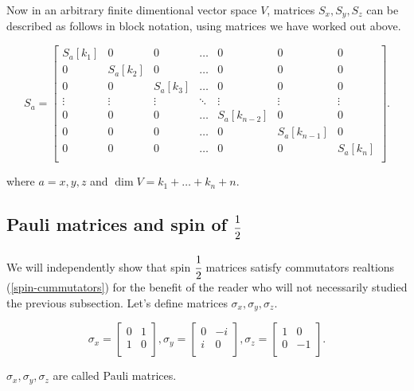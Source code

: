 \documentclass[main.tex]{subfiles}
\begin{document}
Now in an arbitrary finite dimentional vector space $V$, matrices $S_x, S_y, S_z$ can be described as follows in block notation, using matrices we have worked out above.

\begin{equation}
S_a = \begin{bmatrix}
    S_a[k_1] & 0 & 0 & \dots  & 0 & 0 & 0 \\
    0 & S_a[k_2] & 0 & \dots & 0 & 0 & 0\\
    0 & 0 & S_a[k_3] & \dots  & 0 & 0 & 0\\
    \vdots  & \vdots & \vdots  & \ddots & \vdots & \vdots & \vdots\\
    0 & 0 & 0 & \dots  & S_a[k_{n-2}] & 0 & 0 \\
    0 & 0 & 0 & \dots & 0 & S_a[k_{n-1}] & 0\\
    0 & 0 & 0 & \dots  & 0 & 0 & S_a[k_n]\\
\end{bmatrix}.
\end{equation}

where $a = x, y, z$ and $\dim V = k_1 + \dots + k_n + n$.


\subsection{Pauli matrices and spin of $\cfrac{1}{2}$}
We will independently show that spin $\cfrac{1}{2}$ matrices satisfy commutators realtions (\ref{spin-cummutators}) for the benefit of the reader who will not necessarily studied the previous subsection.
Let's define matrices $\sigma_x, \sigma_y, \sigma_z$.

\begin{equation}
\sigma_x = \begin{bmatrix}
    0 &  1 \\
    1 & 0 \\
\end{bmatrix},
\sigma_y = \begin{bmatrix}
    0 &  -i \\
    i & 0 \\
\end{bmatrix},
\sigma_z = \begin{bmatrix}
    1 &  0 \\
    0 & -1 \\
\end{bmatrix}.
\end{equation}

$\sigma_x, \sigma_y, \sigma_z$ are called Pauli matrices.
\end{document}
